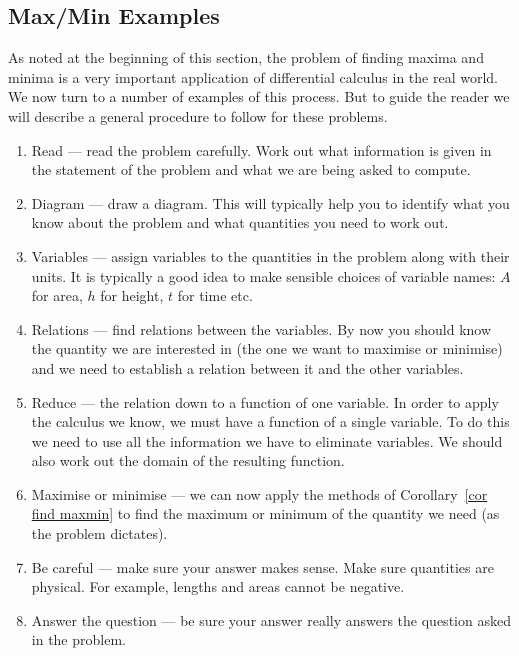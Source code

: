 \subsection{Max/Min Examples}\label{sec opt eg}
As noted at the beginning of this section, the problem of finding maxima and minima is
a very important application of differential calculus in the real world. We now turn to a
number of examples of this process. But to guide the reader we will describe a general
procedure to follow for these problems.

\begin{enumerate}[(1)]
 \item Read --- read the problem carefully. Work out what information is given in the
statement of the problem and what we are being asked to compute.
\item Diagram --- draw a diagram. This will typically help you to identify what you know
about the problem and what quantities you need to work out.
\item Variables --- assign variables to the quantities in the problem along
with their units. It is typically a good idea to make sensible choices of variable names:
$A$ for area, $h$ for height, $t$ for time etc.
\item Relations --- find relations between the variables. By now you should know the
quantity we are interested in (the one we want to maximise or minimise) and we
need to establish a relation between it and the other variables.
\item Reduce --- the relation down to a function of one variable. In order to apply the
calculus we know, we must have a function of a single variable. To do this we need to use
all the information we have to eliminate variables. We should also work out
the domain of the resulting function.
\item Maximise or minimise --- we can now apply the methods of Corollary~\ref{cor find
maxmin} to find the maximum or minimum of the quantity we need (as the problem dictates).
\item Be careful --- make sure your answer makes sense. Make sure quantities are
physical. For example, lengths and areas cannot be negative.
\item Answer the question --- be sure your answer really answers the question asked in
the problem.
\end{enumerate}

